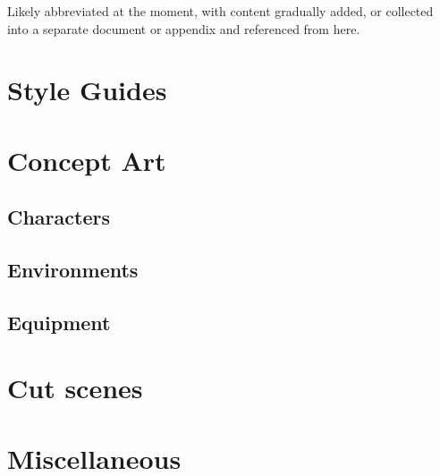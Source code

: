 Likely abbreviated at the moment, with content gradually added, or collected into a separate document or appendix and referenced from here.
\section{Style Guides}
\section{Concept Art}
\subsection{Characters}
\subsection{Environments}
\subsection{Equipment}
\section{Cut scenes}
\section{Miscellaneous}
